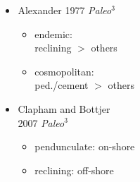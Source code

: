 \documentclass{beamer}
\begin{document}
\begin{frame}
\begin{columns}
\begin{column}{0.5\textwidth}
\begin{center}
        \tiny{}
      \end{center}
    \end{column}
    \begin{column}{0.5\textwidth}
      \begin{itemize}
        \item Alexander 1977 \textit{Paleo\(^3\)}
          \begin{itemize}
            \item endemic: \\reclining \(>\) others
            \item cosmopolitan: \\ped./cement \(>\) others
          \end{itemize}
        \item Clapham and Bottjer \\2007 \textit{Paleo\(^3\)}
          \begin{itemize}
            \item pendunculate: on-shore
            \item reclining: off-shore
          \end{itemize}
      \end{itemize}
    \end{column}
  \end{columns}
\end{frame}
\end{document}
